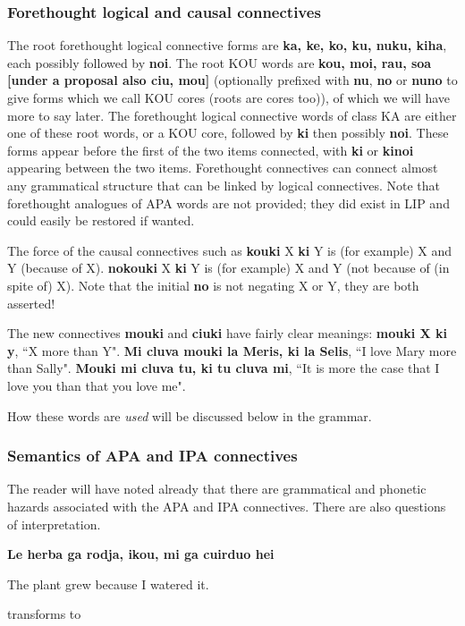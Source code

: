 \documentclass[12pt]{book}
\begin{document}
{\subsubsection{Forethought logical and causal connectives}

The root forethought logical connective forms are {\bf ka, ke, ko, ku, nuku, kiha}, each  possibly followed by {\bf noi}.   The root KOU words are {\bf kou, moi, rau, soa [under a proposal also ciu, mou]} (optionally prefixed with {\bf nu}, {\bf no} or {\bf nuno} to give forms which we call KOU cores (roots are cores too)), of which we will have more to say later.
The forethought logical connective words of class KA are either one of these root words, or a KOU core, followed by {\bf ki} then possibly {\bf noi}.   These forms appear before the first of the two items connected, with {\bf ki} or {\bf kinoi} appearing between the two items.   Forethought connectives can connect almost any grammatical structure that can be linked by logical connectives.   Note that forethought analogues of APA words are not provided; they did exist in LIP and could easily be restored if wanted.

The force of the causal connectives such as {\bf kouki} X {\bf ki} Y is (for example)  X and Y (because of X).   {\bf nokouki} X {\bf ki} Y is (for example)  X and Y (not because of (in spite of) X).  Note
that the initial {\bf no} is not negating X or Y, they are both asserted!  

The new connectives {\bf mouki} and {\bf ciuki}  have fairly clear meanings:  {\bf mouki X ki y}, ``X more than Y".  {\bf Mi cluva mouki la Meris, ki la Selis}, ``I love Mary more than Sally".  {\bf Mouki mi cluva tu, ki tu cluva mi}, ``It is more the case that I love you than that you love me".

How these words are {\em used\/} will be discussed below in the grammar.

\subsubsection{Semantics of APA and IPA connectives}

The reader will have noted already that there are grammatical and phonetic hazards associated with the APA and IPA connectives.  There are also questions of interpretation.

{\bf Le herba ga rodja, ikou, mi ga cuirduo hei}

The plant grew because I watered it.

transforms to

}
\end{document}
